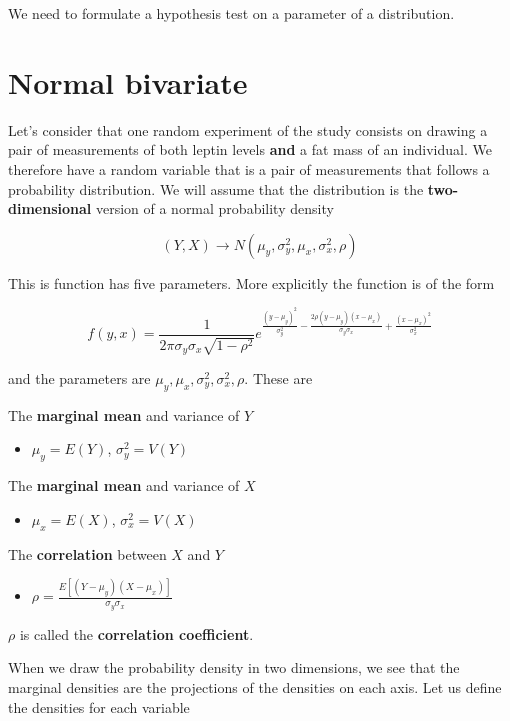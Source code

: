 \documentclass[
]{book}
\providecommand{\tightlist}{%
  \setlength{\itemsep}{0pt}\setlength{\parskip}{0pt}}
\begin{document}
We need to formulate a hypothesis test on a parameter of a distribution.

\hypertarget{normal-bivariate}{%
\section{Normal bivariate}\label{normal-bivariate}}

Let's consider that one random experiment of the study consists on drawing a pair of measurements of both leptin levels \textbf{and} a fat mass of an individual. We therefore have a random variable that is a pair of measurements that follows a probability distribution. We will assume that the distribution is the \textbf{two-dimensional} version of a normal probability density

\[(Y, X) \rightarrow N(\mu_y, \sigma^2_y, \mu_x, \sigma^2_x, \rho)\]

This is function has five parameters. More explicitly the function is of the form

\[f(y,x)=\frac{1}{2\pi \sigma_y\sigma_x \sqrt{1-\rho^2}}e^{\frac{(y-\mu_y)^2}{\sigma_y^2}-\frac{2\rho(y-\mu_y)(x-\mu_x)}{\sigma_y\sigma_x}+\frac{(x-\mu_x)^2}{\sigma_x^2}}\]

and the parameters are \(\mu_y, \mu_x, \sigma^2_y, \sigma_x^2, \rho\). These are

The \textbf{marginal mean} and variance of \(Y\)

\begin{itemize}
\tightlist
\item
  \(\mu_y=E(Y)\), \(\sigma^2_y=V(Y)\)
\end{itemize}

The \textbf{marginal mean} and variance of \(X\)

\begin{itemize}
\tightlist
\item
  \(\mu_x=E(X)\), \(\sigma^2_x=V(X)\)
\end{itemize}

The \textbf{correlation} between \(X\) and \(Y\)

\begin{itemize}
\tightlist
\item
  \(\rho=\frac{E[(Y-\mu_y)(X-\mu_x)]}{\sigma_y\sigma_x}\)
\end{itemize}

\(\rho\) is called the \textbf{correlation coefficient}.

When we draw the probability density in two dimensions, we see that the marginal densities are the projections of the densities on each axis. Let us define the densities for each variable
\end{document}
